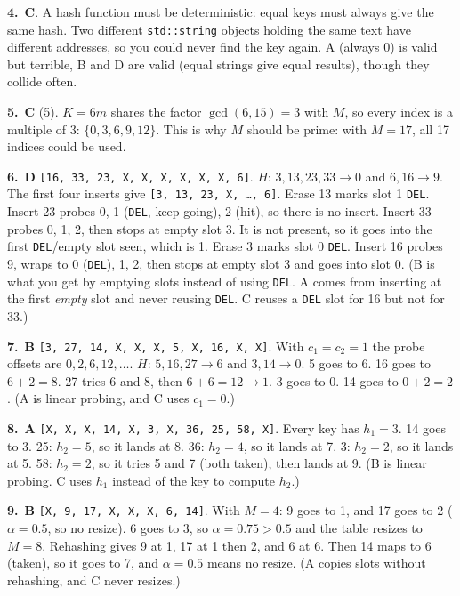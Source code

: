 \documentclass[11pt]{article}
\newcounter{q}
\newcommand{\answer}[1]{\par\vspace{6pt}\textbf{#1.}~}
\begin{document}
\answer{4}\textbf{C}. A hash function must be deterministic: equal keys must always give the same hash. Two different
\texttt{std::string} objects holding the same text have different addresses, so you could never find the key again.
A (always 0) is valid but terrible, B and D are valid (equal strings give equal results), though they collide often.


\answer{5}\textbf{C} (5). $K = 6m$ shares the factor $\gcd(6, 15) = 3$ with $M$, so every index is a multiple of 3: $\{0, 3, 6, 9, 12\}$.
This is why $M$ should be prime: with $M = 17$, all 17 indices could be used.


\answer{6}\textbf{D} \texttt{[16, 33, 23, X, X, X, X, X, X, 6]}.
$H$: $3, 13, 23, 33 \to 0$ and $6, 16 \to 9$. The first four inserts give \texttt{[3, 13, 23, X, \dots, 6]}.
Erase 13 marks slot 1 \texttt{DEL}. Insert 23 probes 0, 1 (\texttt{DEL}, keep going), 2 (hit), so there is no insert.
Insert 33 probes 0, 1, 2, then stops at empty slot 3. It is not present, so it goes into the first \texttt{DEL}/empty slot seen, which is 1.
Erase 3 marks slot 0 \texttt{DEL}. Insert 16 probes 9, wraps to 0 (\texttt{DEL}), 1, 2, then stops at empty slot 3 and goes into slot 0.
(B is what you get by emptying slots instead of using \texttt{DEL}. A comes from inserting at the first \emph{empty} slot and never reusing \texttt{DEL}. C reuses a \texttt{DEL} slot for 16 but not for 33.)


\answer{7}\textbf{B} \texttt{[3, 27, 14, X, X, X, 5, X, 16, X, X]}.
With $c_1 = c_2 = 1$ the probe offsets are $0, 2, 6, 12, \dots$.
$H$: $5, 16, 27 \to 6$ and $3, 14 \to 0$. 5 goes to 6. 16 goes to $6+2 = 8$. 27 tries 6 and 8, then $6+6 = 12 \to 1$.
3 goes to 0. 14 goes to $0+2 = 2$. (A is linear probing, and C uses $c_1 = 0$.)


\answer{8}\textbf{A} \texttt{[X, X, X, 14, X, 3, X, 36, 25, 58, X]}.
Every key has $h_1 = 3$. 14 goes to 3.
25: $h_2 = 5$, so it lands at 8. 36: $h_2 = 4$, so it lands at 7. 3: $h_2 = 2$, so it lands at 5.
58: $h_2 = 2$, so it tries 5 and 7 (both taken), then lands at 9.
(B is linear probing. C uses $h_1$ instead of the key to compute $h_2$.)


\answer{9}\textbf{B} \texttt{[X, 9, 17, X, X, X, 6, 14]}.
With $M = 4$: 9 goes to 1, and 17 goes to 2 ($\alpha = 0.5$, so no resize). 6 goes to 3, so $\alpha = 0.75 > 0.5$ and the table resizes to $M = 8$.
Rehashing gives 9 at 1, 17 at 1 then 2, and 6 at 6. Then 14 maps to 6 (taken), so it goes to 7, and $\alpha = 0.5$ means no resize.
(A copies slots without rehashing, and C never resizes.)
\end{document}
